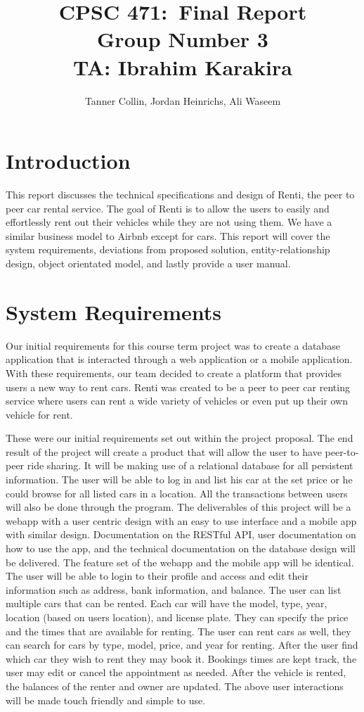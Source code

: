 \documentclass{article}
\title{
\vspace{2in}
\textmd{\textbf{CPSC 471:\ Final Report}}\\
\normalsize\vspace{0.1in}\small{Group Number 3 \\ TA: Ibrahim Karakira}\\
\vspace{3in}
}
\author{Tanner Collin, Jordan Heinrichs, Ali Waseem}
\date{}
\begin{document}
\maketitle
\newpage
\tableofcontents
\newpage

\section{Introduction}
This report discusses the technical specifications and design of Renti, the peer to peer car rental service.
The goal of Renti is to allow the users to easily and effortlessly rent out their vehicles while they are not using them.
We have a similar business model to Airbnb except for cars. This report will cover the system requirements,
deviations from proposed solution, entity-relationship design, object orientated model, and lastly provide a user manual.

\section{System Requirements}
Our initial requirements for this course term project was to create a database application that is interacted through
a web application or a mobile application. With these requirements, our team decided to create a platform that provides users
a new way to rent cars. Renti was created to be a peer to peer car renting service where users can rent a wide variety of vehicles
or even put up their own vehicle for rent.

These were our initial requirements set out within the project proposal. The end result of the project will create a product that will allow the user to have peer-to-peer ride sharing.
It will be making use of a relational database for all persistent information. The user will be able to log in and list his car at the set price or he could browse for all listed cars in a location.
All the transactions between users will also be done through the program. The deliverables of this project will be a webapp with a user centric design with an easy to use interface and a mobile app with similar design.
Documentation on the RESTful API, user documentation on how to use the app, and the technical documentation on the database design will be delivered.
The feature set of the webapp and the mobile app will be identical. The user will be able to login to their profile and access and edit their information such as address, bank information, and balance.
The user can list multiple cars that can be rented. Each car will have the model, type, year, location (based on users location), and license plate. They can specify the price and the times that are available for renting.
The user can rent cars as well, they can search for cars by type, model, price, and year for renting. After the user find which
car they wish to rent they may book it. Bookings times are kept track, the user may edit or cancel the appointment as needed.
After the vehicle is rented, the balances of the renter and owner are updated. The above user interactions will be made touch friendly and simple to use.
\end{document}
